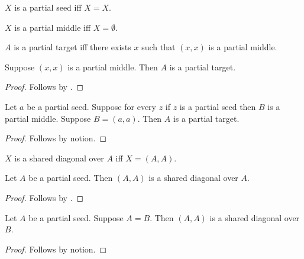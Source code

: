\begin{definition}\label{horn_partial_seed}
    $X$ is a partial seed iff $X=X$.
\end{definition}

\begin{definition}\label{horn_partial_middle}
    $X$ is a partial middle iff $X=\emptyset$.
\end{definition}

\begin{definition}\label{horn_partial_target}
    $A$ is a partial target iff there exists $x$ such that $(x,x)$ is a partial middle.
\end{definition}

\begin{classification}\label{horn_partial_consumer}
    Suppose $(x,x)$ is a partial middle.
    Then $A$ is a partial target.
\end{classification}
\begin{proof}
    Follows by .
\end{proof}

\begin{proposition}\label{horn_partial_equality}
    Let $a$ be a partial seed.
    Suppose for every $z$ if $z$ is a partial seed then $B$ is a partial middle.
    Suppose $B=(a,a)$.
    Then $A$ is a partial target.
\end{proposition}
\begin{proof}
    Follows by notion.
\end{proof}

\begin{definition}\label{shared_parameter_diagonal}
    $X$ is a shared diagonal over $A$ iff $X=(A,A)$.
\end{definition}

\begin{classification}\label{shared_parameter_rule}
    Let $A$ be a partial seed.
    Then $(A,A)$ is a shared diagonal over $A$.
\end{classification}
\begin{proof}
    Follows by .
\end{proof}

\begin{proposition}\label{shared_parameter_transport}
    Let $A$ be a partial seed.
    Suppose $A=B$.
    Then $(A,A)$ is a shared diagonal over $B$.
\end{proposition}
\begin{proof}
    Follows by notion.
\end{proof}

